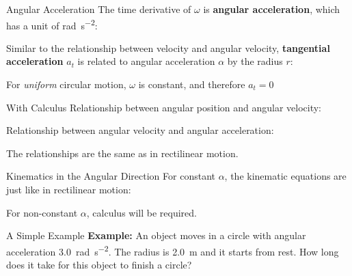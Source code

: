 \documentclass[12pt,compress,aspectratio=169]{beamer}
\begin{document}
\begin{frame}{Angular Acceleration}
  The time derivative of $\omega$ is \textbf{angular acceleration}, which
  has a unit of \si{\radian\per\second\squared}:


  Similar to the relationship between velocity and angular velocity,
  \textbf{tangential acceleration} $a_t$ is related to angular acceleration
  $\alpha$ by the radius $r$:
    
    
  For \emph{uniform} circular motion, $\omega$ is constant, and therefore
  $a_t=0$
\end{frame}



\begin{frame}{With Calculus}
  Relationship between angular position and angular velocity:


  Relationship between angular velocity and angular acceleration:


  The relationships are the same as in rectilinear motion.
\end{frame}




\begin{frame}{Kinematics in the Angular Direction}
  For constant $\alpha$, the kinematic equations are just like in rectilinear
  motion:

  
  For non-constant $\alpha$, calculus will be required.
\end{frame}



\begin{frame}{A Simple Example}
  \textbf{Example:} An object moves in a circle with angular acceleration
  \SI{3.0}{\radian\per\second\squared}. The radius is \SI{2.0}{\metre} and it
  starts from rest. How long does it take for this object to finish a circle?
\end{frame}
\end{document}
